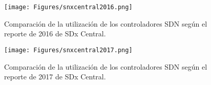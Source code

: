 \begin{figure}[th]
	\centering
		\texttt{[image: Figures/snxcentral2016.png]}
		\caption{Comparación de la utilización de los controladores SDN según el reporte de 2016 de SDx Central.}
		\label{fig:2016Report}
\end{figure}
\begin{figure}[th]
	\centering
		\texttt{[image: Figures/snxcentral2017.png]}
		\caption{Comparación de la utilización de los controladores SDN según el reporte de 2017 de SDx Central.}
		\label{fig:2017Report}
\end{figure}